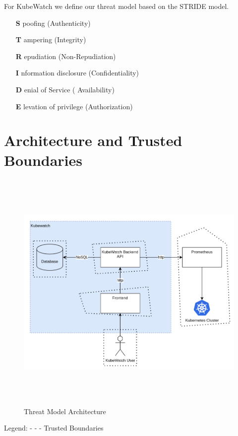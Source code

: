 For KubeWatch we define our threat model based on the STRIDE model.
\begin{itemize}
    \item [{\bfseries S}]poofing (Authenticity)
    \item [{\bfseries T}]ampering (Integrity)
    \item [{\bfseries R}]epudiation (Non-Repudiation)
    \item [{\bfseries I}]nformation disclosure (Confidentiality)
    \item [{\bfseries D}]enial of Service ( Availability)
    \item [{\bfseries E}]levation of privilege (Authorization)
\end{itemize}


\section{Architecture and Trusted Boundaries}

\begin{figure}[h]
    \centering
    \caption{\label{fig:threat-model-architecture}Threat Model Architecture}
    \includegraphics[height=12cm]{resources/architecture_threat_model.png}
\end{figure}
Legend: \newline
- - - Trusted Boundaries


\newpage

